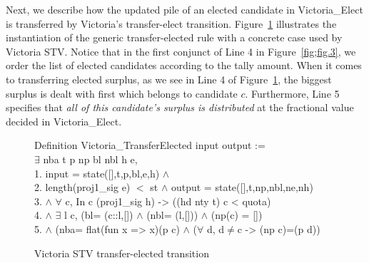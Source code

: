 \documentclass{llncs}
\begin{document}
Next, we describe how the updated pile of an elected candidate in {\selectfont Victoria\_Elect} is transferred by Victoria's transfer-elect transition.       
Figure~\ref{fig;fig.4} illustrates the instantiation of the generic
transfer-elected rule with a concrete case used by Victoria STV.
Notice that in the first conjunct of Line 4 in
Figure~\ref{fig;fig.3}, we order the list of elected candidates
according to the tally amount. When it comes to transferring elected
surplus, as we see in Line 4 of Figure~\ref{fig;fig.4}, the biggest
surplus is dealt with first which belongs to candidate $c$.
Furthermore, Line 5 specifies that  \emph{all of this candidate's
surplus is distributed} at the fractional value decided in
{\selectfont Victoria\_Elect}.
\begin{scriptsize}
\begin{figure}[t]
{\selectfont
 Definition Victoria\_TransferElected \textsf{input} \textsf{output} :=\\ $\exists$ nba t p np bl nbl h e, \\
     1. \textsf{input} = \textsf{state}([],t,p,bl,e,h) $\wedge$\\
     2. \textsf{length}(proj1\_sig e) $<$ st $\wedge$
     \textsf{output} = \textsf{state}([],t,np,nbl,ne,nh)\\
     3. $\wedge$ $\forall$ c, In c (proj1\_sig h) -> ((\textsf{hd} nty t) c < quota)\\
 4. $\wedge$ $\exists$ l c, (bl= (c::l,[]) $\wedge$ (nbl= (l,[])) $\wedge$ (np(c) = []) \\
 5. $\wedge$ (nba= \textsf{flat}(fun x => x)(p c) $\wedge$ ($\forall$ d, d$\neq$c -> (np c)=(p d))\\  
}
\caption{Victoria STV transfer-elected transition}
\label{fig;fig.4}
\end{figure}
\end{scriptsize}
\end{document}

